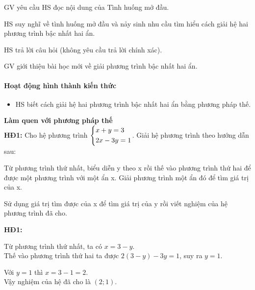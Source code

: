 \tochucthuchien

\begin{tcth}
    \buocmot
    \item GV yêu cầu HS đọc nội dung của Tình huống mở đầu. 
    \buochai
    \item HS suy nghĩ về tình huống mở đầu và nảy sinh nhu cầu tìm hiểu cách giải hệ hai phương trình bậc nhất hai ẩn.
    \buocba
    \item HS trả lời câu hỏi (không yêu cầu trả lời chính xác).
    \buocbon
    \item GV giới thiệu bài học mới về giải phương trình bậc nhất hai ẩn.
\end{tcth}

\paragraph{Hoạt động hình thành kiến thức}

\muctieu

\begin{itemize}
    \item HS biết cách giải hệ hai phương trình bậc nhất hai ẩn bằng phương pháp thế. 
\end{itemize}

\noidungsanpham

\begin{ttkp}
    \textbf{Làm quen với phương pháp thế}\\
    \textbf{HĐ1:} 
    Cho hệ phương trình $\left\{\begin{aligned}&x+y=3\\&2x-3y=1\end{aligned}\right.$. Giải hệ phương trình theo hướng dẫn sau:
    \begin{listEX} 
        \item Từ phương trình thứ nhất, biểu diễn y theo x rồi thế vào phương trình thứ hai để được một phương trình với một ẩn x. Giải phương trình một ẩn đó để tìm giá trị của x. 
        \item Sử dụng giá trị tìm được của x để tìm giá trị của y rồi viết nghiệm của hệ phương trình đã cho. 
    \end{listEX}
    \doicot
    \textbf{HĐ1:}
    \begin{listEX}
        \item Từ phương trình thứ nhất, ta có $x=3-y$.\\
        Thế vào phương trình thứ hai ta được $2(3-y)-3y=1$, suy ra $y=1$.
        \item Với $y=1$ thì $x=3-1=2$.\\
        Vậy nghiệm của hệ đã cho là $(2;1)$.
    \end{listEX} 
\end{ttkp}

